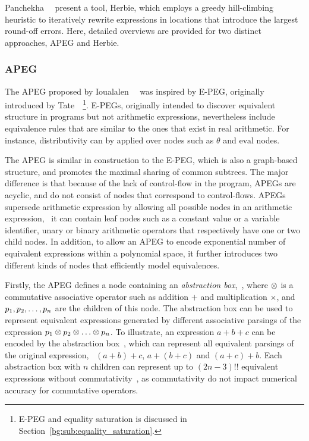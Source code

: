 Panchekha~\etal~\cite{panchekha15} present a tool, Herbie, which employs a
greedy hill-climbing heuristic to iteratively rewrite expressions in locations
that introduce the largest round-off errors.  Here, detailed overviews are
provided for two distinct approaches, APEG and Herbie.

\subsubsection{APEG}

The APEG proposed by Ioualalen~\etal~\cite{ioualalen} was inspired by E-PEG,
originally introduced by Tate~\etal~\cite{tate09}\footnote{E-PEG and equality
saturation is discussed in Section~\ref{bg:sub:equality_saturation}.}.  E-PEGs,
originally intended to discover equivalent structure in programs but not
arithmetic expressions, nevertheless include equivalence rules that are similar
to the ones that exist in real arithmetic.  For instance, distributivity can by
applied over nodes such as $\theta$ and $\mathrm{eval}$ nodes.

The APEG is similar in construction to the E-PEG, which is also a graph-based
structure, and promotes the maximal sharing of common subtrees.  The major
difference is that because of the lack of control-flow in the program, APEGs
are acyclic, and do not consist of nodes that correspond to control-flows.
APEGs supersede arithmetic expression by allowing all possible nodes in an
arithmetic expression, \ie~it can contain leaf nodes such as a constant
value or a variable identifier, unary or binary arithmetic operators that
respectively have one or two child nodes.  In addition, to allow an APEG to
encode exponential number of equivalent expressions within a polynomial space,
it further introduces two different kinds of nodes that efficiently model
equivalences.

Firstly, the APEG defines a node containing an \emph{abstraction box},
\,, where
$\otimes$ is a commutative associative operator such as addition $+$ and
multiplication $\times$, and $p_1, p_2, \mathellipsis, p_n$ are the children of
this node.  The abstraction box can be used to represent equivalent expressions
generated by different associative parsings of the expression $p_1 \otimes
p_2 \otimes \mathellipsis \otimes p_n$.  To illustrate, an expression $a
+ b + c$ can be encoded by the abstraction box \,, which
can represent all equivalent parsings of the original expression, \ie~$(a
+ b) + c$, $a + (b + c)$ and $(a + c) + b$.  Each abstraction box with $n$
children can represent up to $(2n - 3){!!}$ equivalent expressions without
commutativity~\cite{ioualalen, mouilleron}, as commutativity do not impact
numerical accuracy for commutative operators.

